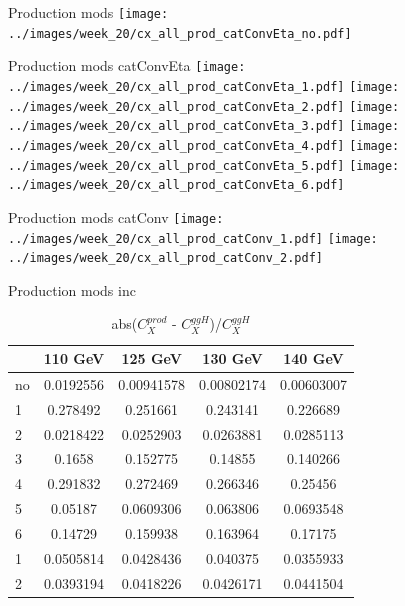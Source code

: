 \documentclass[10pt,UKenglish, leqno, xcolor = dvipsnames]{beamer}
\begin{document}
		\begin{frame}{Production mods}
			\vfill
			\centering
			\texttt{[image: ../images/week\_20/cx\_all\_prod\_catConvEta\_no.pdf]}
			\vfill
		\end{frame}
		
		\begin{frame}{Production mods catConvEta}
			\vfill
			\centering
			\texttt{[image: ../images/week\_20/cx\_all\_prod\_catConvEta\_1.pdf]}
			\texttt{[image: ../images/week\_20/cx\_all\_prod\_catConvEta\_2.pdf]}
			\texttt{[image: ../images/week\_20/cx\_all\_prod\_catConvEta\_3.pdf]}
			\texttt{[image: ../images/week\_20/cx\_all\_prod\_catConvEta\_4.pdf]}
			\texttt{[image: ../images/week\_20/cx\_all\_prod\_catConvEta\_5.pdf]}
			\texttt{[image: ../images/week\_20/cx\_all\_prod\_catConvEta\_6.pdf]}
			\vfill
		\end{frame}
	
		\begin{frame}{Production mods catConv}
			\vfill
			\centering
			\texttt{[image: ../images/week\_20/cx\_all\_prod\_catConv\_1.pdf]}
			\texttt{[image: ../images/week\_20/cx\_all\_prod\_catConv\_2.pdf]}
			\vfill
		\end{frame}
	
		\begin{frame}{Production mods inc}
			\vfill
			\centering
			\begin{table}[tbp]
				\centering
				\begin{tabular}{lcccc}
					\toprule[1.5pt]
					& 110 GeV	& 125 GeV	& 130 GeV	& 140 GeV	\\
					\midrule
					no & 0.0192556 & 0.00941578 & 0.00802174 & 0.00603007 \\
					\midrule
					1 & 0.278492 & 0.251661 & 0.243141 & 0.226689 \\
					2 & 0.0218422 & 0.0252903 & 0.0263881 & 0.0285113 \\
					3 & 0.1658 & 0.152775 & 0.14855 & 0.140266 \\
					4 & 0.291832 & 0.272469 & 0.266346 & 0.25456 \\
					5 & 0.05187 & 0.0609306 & 0.063806 & 0.0693548 \\
					6 & 0.14729 & 0.159938 & 0.163964 & 0.17175 \\
					\midrule
					1 & 0.0505814 & 0.0428436 & 0.040375 & 0.0355933 \\
					2 & 0.0393194 & 0.0418226 & 0.0426171 & 0.0441504 \\
					\bottomrule[1.5pt]
				\end{tabular}
				\caption{abs($C_X^{prod}$ - $C_X^{ggH}$)/$C_X^{ggH}$}
			\end{table}
			\vfill
		\end{frame}
	
\end{document}
